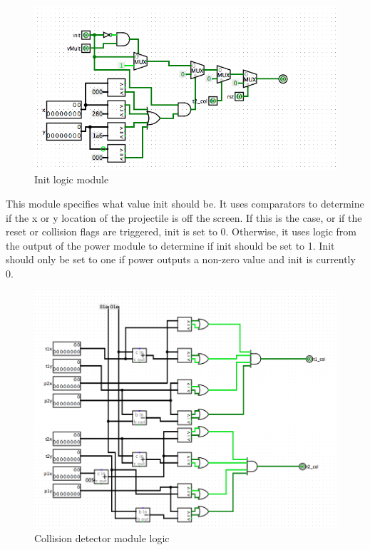 \documentclass{article}
\begin{document}
\begin{figure}[H]
	\begin{center}
		\includegraphics[width=1\textwidth]{init.png} 
		\caption{Init logic module}
	\end{center}
\end{figure}

This module specifies what value init should be. It uses comparators to determine if the x or y location of the projectile is off the screen. If this is the case, or if the reset or collision flags are triggered, init is set to 0. Otherwise, it uses logic from the output of the power module to determine if init should be set to 1. Init should only be set to one if power outputs a non-zero value and init is currently 0.

\begin{figure}[H]
	\begin{center}
		\includegraphics[width=1\textwidth]{coldet.png} 
		\caption{Collision detector module logic}
	\end{center}
\end{figure}
\end{document}
